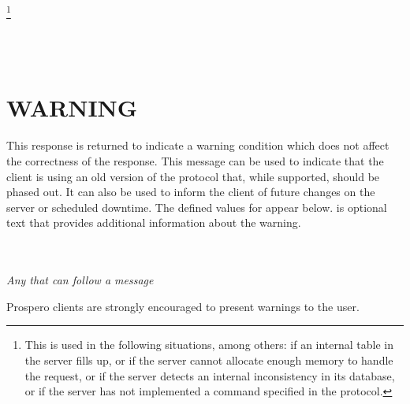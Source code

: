 \begin{command}
   \ors{} \metaor {} \metaor
	 \metaor {} \metaor {} \metaor
	 \ore \\
   \\
   \\
   \\
   \\
   \\
   \\
  \footnote{This is used in the following
	situations, among others: if
	an internal table in the server fills up, or if the server cannot
	allocate enough memory to handle the request, or if the server detects
	an internal inconsistency in its database, or if the server
has not implemented a command specified in the protocol.}\\
   \\
   \\
   \\
\end{command}

\section{WARNING}

\begin{command}
\commandsize
\protect{} \protect{}
	\zoos\protect{}\zooe
\end{command}

This response is returned to indicate a warning condition which does
not affect the correctness of the response.  This message can be used
to indicate that the client is using an old version of the protocol
that, while supported, should be phased out.  It can also be used to
inform the client of future changes on the server or scheduled
downtime.  The defined values for  appear
below.   is optional text that provides additional
information about the warning.

\begin{command}
   \\
   \\
  {\em Any  that can follow a  message}
\end{command}
Prospero clients are strongly encouraged to present warnings to the user.


